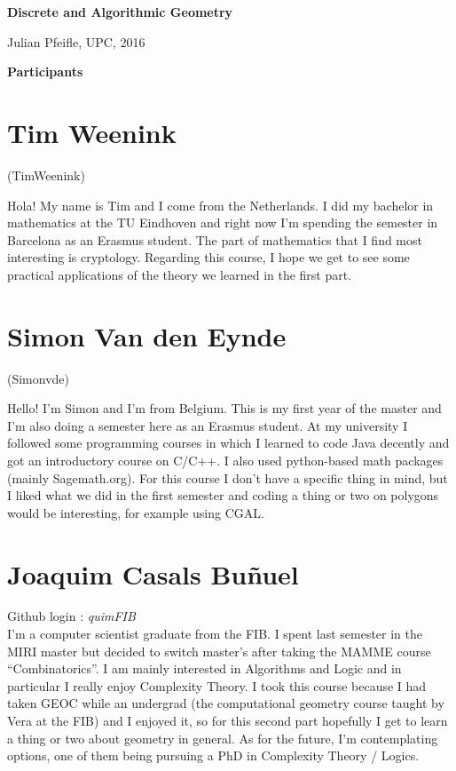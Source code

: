 \documentclass[11pt]{amsart}
\begin{document}
\begin{center}
\textbf{\sffamily
   Discrete and Algorithmic Geometry }

\medskip
   Julian Pfeifle,
   UPC, 2016 
\end{center}

\bigskip

\begin{center}
  \textbf{\sffamily Participants}
\end{center}

\medskip

\section*{Tim Weenink}
(TimWeenink) 

Hola! My name is Tim and I come from the Netherlands. I did my bachelor in mathematics at the TU Eindhoven and right now I'm spending the semester in Barcelona as an Erasmus student. The part of mathematics that I find most interesting is cryptology. Regarding this course, I hope we get to see some practical applications of the theory we learned in the first part. 

\medskip

\section*{Simon Van den Eynde}
(Simonvde)

Hello! I'm Simon and I'm from Belgium. This is my first year of the master and I'm also doing a semester here as an Erasmus student. At my university I followed some programming courses in which I learned to code Java decently and got an introductory course on C/C++. I also used python-based math packages (mainly Sagemath.org). For this course I don't have a specific thing in mind, but I liked what we did in the first semester and coding a thing or two on polygons would be interesting, for example using CGAL.

\medskip

\section*{Joaquim Casals Bu\~{n}uel}
Github login : \emph{quimFIB}\\

I'm a computer scientist graduate from the FIB. I spent last semester in the MIRI master but decided to switch master's after taking the
MAMME course ``Combinatorics''. I am mainly interested in Algorithms and Logic and in particular I really enjoy Complexity Theory. I took
this course because I had taken GEOC while an undergrad (the computational geometry course taught by Vera at the FIB) and I enjoyed it, so for this second
part hopefully I get to learn a thing or two about geometry in general. As for the future, I'm contemplating options, one of them being pursuing
a PhD in Complexity Theory / Logics.
\end{document}

